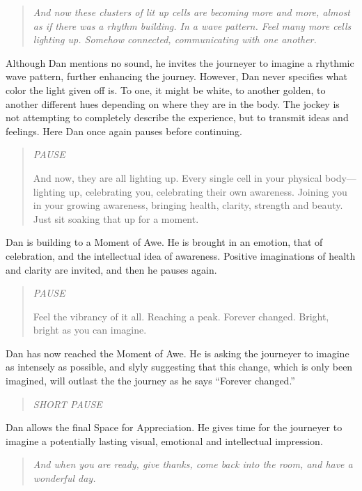 \documentclass[12pt]{book}
\begin{document}
\begin{quote}{\em
And now these clusters of lit up cells are becoming more and more, almost
as if there was a rhythm building.
In a wave pattern. Feel many more cells lighting up. Somehow connected,
communicating with one another.
}\end{quote}

Although Dan mentions no sound, he invites the journeyer to imagine a rhythmic wave pattern, further enhancing the journey. However, Dan never specifies what color the light given off is. To one, it might be white, to another golden, to another different hues depending on where they are in the body. The jockey is not attempting to completely describe the experience, but to transmit ideas and feelings. Here Dan once again pauses before continuing.


\begin{quote}{\em
  PAUSE



And now, they are all lighting up. Every single cell in your physical
body---lighting up, celebrating you, celebrating their own awareness.
Joining you in your growing awareness, bringing health, clarity,
strength and beauty. Just sit soaking that up for a moment.
  }\end{quote}

Dan is building to a Moment of Awe. He is brought in an emotion, that of celebration, and the intellectual idea of awareness. Positive imaginations of health and clarity are invited, and then he pauses again.

\begin{quote}{\em
PAUSE

Feel the vibrancy of it all. Reaching a peak. Forever changed.
Bright, bright as you can imagine.
  }\end{quote}


Dan has now reached the Moment of Awe. He is asking the journeyer to imagine as intensely as possible, and slyly suggesting that this change, which is only been imagined, will outlast the the journey as he says ``Forever changed.''

\begin{quote}{\em
  SHORT PAUSE
  }\end{quote}

Dan allows the final Space for Appreciation. He gives time for the journeyer to imagine a potentially lasting visual, emotional and intellectual impression.


\begin{quote}{\em
And when you are ready, give thanks, come back into the room,
and have a wonderful day.
}\end{quote}
\end{document}
